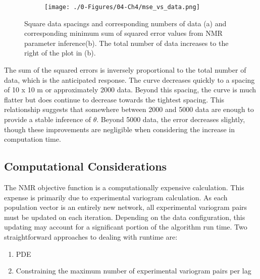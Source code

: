 \begin{figure}
    \begin{subtable}{.5\textwidth}
        \centering
        \resizebox{1\width}{!}{}
        \caption{}
        \label{tab:syn_data}
    \end{subtable}
    \begin{subfigure}{.5\textwidth}
        \centering
        \texttt{[image: ./0-Figures/04-Ch4/mse\_vs\_data.png]}
        \caption{}
        \label{fig:mse_vs_data_plot}
    \end{subfigure}
    \caption{Square data spacings and corresponding numbers of data (a) and corresponding minimum sum of squared error values from \gls{NMR} parameter inference(b). The total number of data increases to the right of the plot in (b). }
    \label{fig:mse_vs_data}
\end{figure}

The sum of the squared errors is inversely proportional to the total number of data, which is the anticipated response. The curve decreases quickly to a spacing of 10 x 10 m or approximately 2000 data. Beyond this spacing, the curve is much flatter but does continue to decrease towards the tightest spacing. This relationship suggests that somewhere between 2000 and 5000 data are enough to provide a stable inference of $\theta$. Beyond 5000 data, the error decreases slightly, though these improvements are negligible when considering the increase in computation time.

\FloatBarrier
\subsection{Computational Considerations}
\label{subsec:04comp}

The NMR objective function is a computationally expensive calculation. This expense is primarily due to experimental variogram calculation. As each population vector is an entirely new network, all experimental variogram pairs must be updated on each iteration. Depending on the data configuration, this updating may account for a significant portion of the algorithm run time. Two straightforward approaches to dealing with runtime are:
\begin{enumerate}
    \item \Gls{PDE}
    \item Constraining the maximum number of experimental variogram pairs per lag
\end{enumerate}

